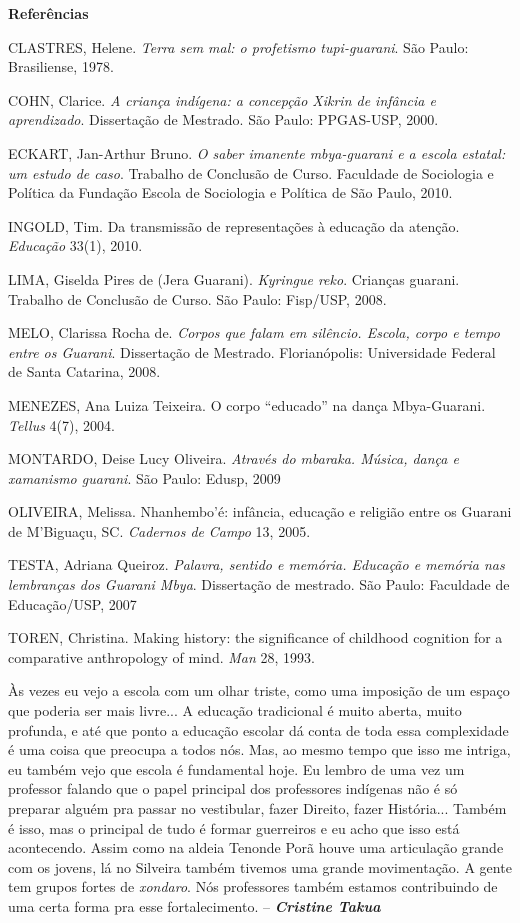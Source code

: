 \textbf{Referências}

CLASTRES, Helene. \emph{Terra sem mal: o profetismo tupi-guarani}. São
Paulo: Brasiliense, 1978.

COHN, Clarice. \emph{A criança indígena: a concepção Xikrin de infância
e aprendizado}. Dissertação de Mestrado. São Paulo: PPGAS-USP, 2000.

ECKART, Jan-Arthur Bruno. \emph{O saber imanente mbya-guarani e a escola
estatal: um estudo de caso}. Trabalho de Conclusão de Curso. Faculdade
de Sociologia e Política da Fundação Escola de Sociologia e Política de
São Paulo, 2010.

INGOLD, Tim. Da transmissão de representações à educação da atenção.
\emph{Educação} 33(1), 2010.

LIMA, Giselda Pires de (Jera Guarani). \emph{Kyringue reko}. Crianças
guarani. Trabalho de Conclusão de Curso. São Paulo: Fisp/USP, 2008.

MELO, Clarissa Rocha de. \emph{Corpos que falam em silêncio. Escola,
corpo e tempo entre os Guarani}. Dissertação de Mestrado. Florianópolis:
Universidade Federal de Santa Catarina, 2008.

MENEZES, Ana Luiza Teixeira. O corpo ``educado'' na dança Mbya-Guarani.
\emph{Tellus} 4(7), 2004.

MONTARDO, Deise Lucy Oliveira. \emph{Através do mbaraka. Música, dança e
xamanismo guarani}. São Paulo: Edusp, 2009

OLIVEIRA, Melissa. Nhanhembo'é: infância, educação e religião entre os
Guarani de M'Biguaçu, SC. \emph{Cadernos de} \emph{Campo} 13, 2005.

TESTA, Adriana Queiroz. \emph{Palavra, sentido e memória. Educação e
memória nas lembranças dos Guarani Mbya}. Dissertação de mestrado. São
Paulo: Faculdade de Educação/USP, 2007

TOREN, Christina. Making history: the significance of childhood
cognition for a comparative anthropology of mind. \emph{Man} 28, 1993.

Às vezes eu vejo a escola com um olhar triste, como uma imposição de um
espaço que poderia ser mais livre... A educação tradicional é muito
aberta, muito profunda, e até que ponto a educação escolar dá conta de
toda essa complexidade é uma coisa que preocupa a todos nós. Mas, ao
mesmo tempo que isso me intriga, eu também vejo que escola é fundamental
hoje. Eu lembro de uma vez um professor falando que o papel principal
dos professores indígenas não é só preparar alguém pra passar no
vestibular, fazer Direito, fazer História... Também é isso, mas o
principal de tudo é formar guerreiros e eu acho que isso está
acontecendo. Assim como na aldeia Tenonde Porã houve uma articulação
grande com os jovens, lá no Silveira também tivemos uma grande
movimentação. A gente tem grupos fortes de \emph{xondaro}. Nós
professores também estamos contribuindo de uma certa forma pra esse
fortalecimento. -- \emph{\textbf{Cristine Takua}}

